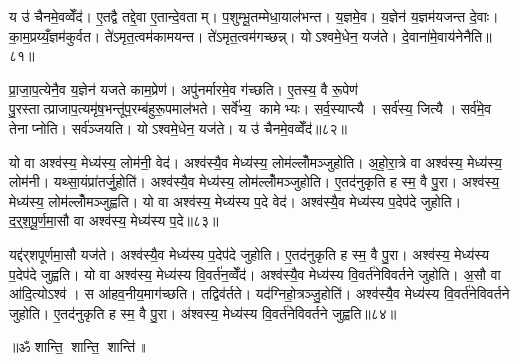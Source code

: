 य उ॑ चैनमे॒वव्वेँद॑। ए॒तद्वै तद्दे॒वा ए॒तान्दे॒वताम्। प॒शुम्भू॒तम्मेधा॒याल॑भन्त। य॒ज्ञमे॒व। य॒ज्ञेन॑ य॒ज्ञम॑यजन्त दे॒वाः। का॒म॒प्रय्यँ॒ज्ञम॑कुर्वत। ते॑ऽमृत॒त्वम॑कामयन्त। ते॑ऽमृत॒त्वम॑गच्छन्न्। योऽश्वमे॒धेन॒ यज॑ते। दे॒वाना॑मे॒वाय॑नेनैति॥८१॥

प्रा॒जा॒प॒त्येनै॒व य॒ज्ञेन॑ यजते काम॒प्रेण॑। अपु॑नर्मारमे॒व ग॑च्छति। ए॒तस्य॒ वै रू॒पेण॑ पु॒रस्तात्प्राजाप॒त्यमृ॑ष॒भन्तू॑प॒रम्ब॑हुरू॒पमाल॑भते। सर्वे॑भ्य॒ कामेभ्यः। सर्व॒स्याप्त्यै। सर्व॑स्य॒ जित्यै। सर्व॑मे॒व तेनाप्नोति। सर्व॑ञ्जयति। योऽश्वमे॒धेन॒ यज॑ते। य उ॑ चैनमे॒वव्वेँद॑॥८२॥\anuvakamend[मेधोऽभ॑व॒द्यज॑त एति॒ वेद॑]

यो वा अश्व॑स्य॒ मेध्य॑स्य॒ लोम॑नी॒ वेद॑। अश्व॑स्यै॒व मेध्य॑स्य॒ लोम॑ल्लोँमञ्जुहोति। अ॒हो॒रा॒त्रे वा अश्व॑स्य॒ मेध्य॑स्य॒ लोम॑नी। यथ्सा॒यंप्रा॑तर्जु॒होति॑। अश्व॑स्यै॒व मेध्य॑स्य॒ लोम॑ल्लोँमञ्जुहोति। ए॒तद॑नुकृति ह स्म॒ वै पु॒रा। अश्व॑स्य॒ मेध्य॑स्य॒ लोम॑ल्लोँमञ्जुह्वति। यो वा अश्व॑स्य॒ मेध्य॑स्य प॒दे वेद॑। अश्व॑स्यै॒व मेध्य॑स्य प॒देप॑दे जुहोति। द॒र्॒श॒पू॒र्ण॒मा॒सौ वा अश्व॑स्य॒ मेध्य॑स्य प॒दे॥८३॥

यद्द॑र्‌शपूर्णमा॒सौ यज॑ते। अश्व॑स्यै॒व मेध्य॑स्य प॒देप॑दे जुहोति। ए॒तद॑नुकृति ह स्म॒ वै पु॒रा। अश्व॑स्य॒ मेध्य॑स्य प॒देप॑दे जुह्वति। यो वा अश्व॑स्य॒ मेध्य॑स्य वि॒वर्त॑न॒व्वेँद॑। अश्व॑स्यै॒व मेध्य॑स्य वि॒वर्त॑नेविवर्तने जुहोति। अ॒सौ वा आ॑दि॒त्योऽश्व॑। स आ॑हव॒नीय॒माग॑च्छति। तद्विव॑र्तते। यद॑ग्निहो॒त्रञ्जु॒होति॑। अश्व॑स्यै॒व मेध्य॑स्य वि॒वर्त॑नेविवर्तने जुहोति। ए॒तद॑नुकृति ह स्म॒ वै पु॒रा। अ॑श्वस्य॒ मेध्य॑स्य वि॒वर्त॑नेविवर्तने जुह्वति॥८४॥\anuvakamend[प॒दे अ॑ग्निहो॒त्रञ्जु॒होति॒ त्रीणि॑ च]

\centerline{॥ॐ शान्ति॒ शान्ति॒ शान्ति॑॥}
